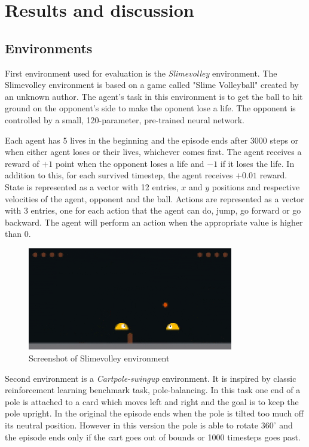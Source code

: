 \chapter{Results and discussion}
\section{Environments}

First environment used for evaluation is the \emph{Slimevolley} environment. The Slimevolley environment \cite{slimevolleygym} is based on a game called "Slime Volleyball" created by an unknown author. The agent's task in this environment is to get the ball to hit ground on the opponent's side to make the oponent lose a life. The opponent is controlled by a small, 120-parameter, pre-trained neural network. \cite{ha2015slimevolley}

Each agent has 5 lives in the beginning and the episode ends after 3000 steps or when either agent loses or their lives, whichever comes first. The agent receives a reward of $+1$ point when the opponent loses a life and $-1$ if it loses the life. In addition to this, for each survived timestep, the agent receives $+0.01$  reward. State is represented as a vector with 12 entries, $x$ and $y$ positions and respective velocities of the agent, opponent and the ball. Actions are represented as a vector with 3 entries, one for each action that the agent can do, jump, go forward or go backward. The agent will perform an action when the appropriate value is higher than 0.

\begin{figure}[h]
    \caption{Screenshot of Slimevolley environment}
    \includegraphics[width=0.8\textwidth]{img/slimevolley.png}
\end{figure}

Second environment is a \emph{Cartpole-swingup} environment. It is inspired by classic reinforcement learning benchmark task, pole-balancing. In this task one end of a pole is attached to a card which moves left and right and the goal is to keep the pole upright. In the original the episode ends when the pole is tilted too much off its neutral position. However in this version the pole is able to rotate $360^\circ$ and the episode ends only if the cart goes out of bounds or 1000 timesteps goes past.

